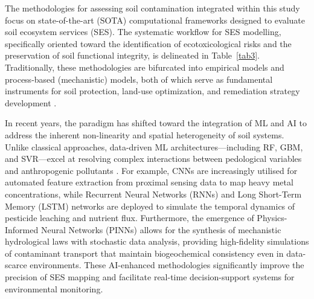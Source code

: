 \documentclass[preprint,12pt]{elsarticle}            %
\begin{document}
The methodologies for assessing soil contamination integrated within this
study focus on state-of-the-art (SOTA) computational frameworks designed to
evaluate soil ecosystem services (SES). The systematic workflow for SES
modelling, specifically oriented toward the identification of ecotoxicological
risks and the preservation of soil functional integrity, is delineated in
Table~\ref{tab3}. Traditionally, these methodologies are bifurcated into
empirical models and process-based (mechanistic) models, both of which serve
as fundamental instruments for soil protection, land-use optimization, and
remediation strategy development
\cite{TeranGomez2025,ElSorogy2025,Lemenkova2020,Lemenkova2021,Sandu2025}.

In recent years, the paradigm has shifted toward the integration of ML and AI
to address the inherent non-linearity and spatial heterogeneity of soil
systems. Unlike classical approaches, data-driven ML architectures---including
RF, GBM, and SVR---excel at resolving complex interactions between pedological
variables and anthropogenic pollutants \cite{Li2025a,Racic2025}. For example,
CNNs are increasingly utilised for automated feature extraction from proximal
sensing data to map heavy metal concentrations, while Recurrent Neural
Networks (RNNs) and Long Short-Term Memory (LSTM) networks are deployed to
simulate the temporal dynamics of pesticide leaching and nutrient flux.
Furthermore, the emergence of Physics-Informed Neural Networks (PINNs) allows
for the synthesis of mechanistic hydrological laws with stochastic data
analysis, providing high-fidelity simulations of contaminant transport that
maintain biogeochemical consistency even in data-scarce environments. These
AI-enhanced methodologies significantly improve the precision of SES mapping
and facilitate real-time decision-support systems for environmental monitoring.
\end{document}

